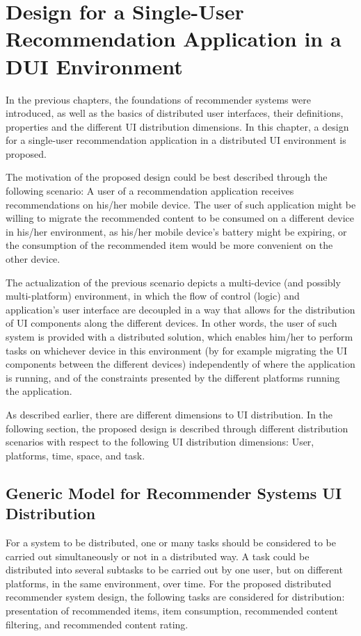\chapter{Design for a Single-User Recommendation Application in a DUI Environment}\label{chapter:design}

In the previous chapters, the foundations of recommender systems were introduced, as well as the basics of distributed user interfaces, their definitions, properties and the different UI distribution dimensions. In this chapter, a design for a single-user recommendation application in a distributed UI environment is proposed.

The motivation of the proposed design could be best described through the following scenario: A user of a recommendation application receives recommendations on his/her mobile device. The user of such application might be willing to migrate the recommended content to be consumed on a different device in his/her environment, as his/her mobile device's battery might be expiring, or the consumption of the recommended item would be more convenient on the other device.

The actualization of the previous scenario depicts a multi-device (and possibly multi-platform) environment, in which the flow of control (logic) and application's user interface are decoupled in a way that allows for the distribution of UI components along the different devices. In other words, the user of such system is provided with a distributed solution, which enables him/her to perform tasks on whichever device in this environment (by for example migrating the UI components between the different devices) independently of where the application is running, and of the constraints presented by the different platforms running the application.

As described earlier, there are different dimensions to UI distribution. In the following section, the proposed design is described through different distribution scenarios with respect to the following UI distribution dimensions: User, platforms, time, space, and task.

\section{Generic Model for Recommender Systems UI Distribution}
For a system to be distributed, one or many tasks should be considered to be carried out simultaneously or not in a distributed way. A task could be distributed into several subtasks to be carried out by one user, but on different platforms, in the same environment, over time. 
For the proposed distributed recommender system design, the following tasks are considered for distribution: presentation of recommended items, item consumption, recommended content filtering, and recommended content rating.  

